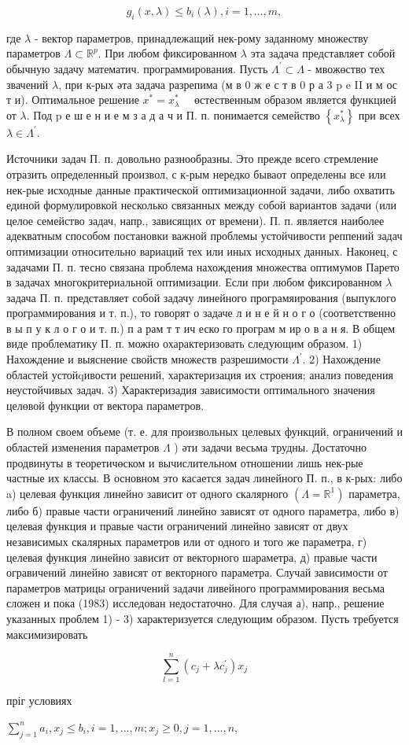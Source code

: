 \documentclass[10pt]{article}
\begin{document}
\[
g_{i}(x, \lambda) \leqslant b_{i}(\lambda), i=1, \ldots, m,
\]

где $\lambda$ - вектор параметров, принадлежащий нек-рому заданному множеству параметров $\Lambda \subset \mathbb{R}^{p}$. При любом фиксированном $\lambda$ эта задача представляет собой обычную задачу математич. программирования. Пусть $\Lambda^{\prime} \subset \Lambda$ - мвожөство тех звачений $\lambda$, при к-рых әта задача разрепима (м в 0 ж е с т в 0 р а 3 p e II и м ос т и). Оптимальное решение $x^{*}=x_{\lambda}^{*} \quad$ өстественным образом является функцией от $\lambda$. Под $\mathrm{p}$ е ш е н и е м з а д а ч и П. п. понимается семейство $\left\{x_{\lambda}^{*}\right\}$ при всех $\lambda \in \Lambda^{\prime}$.

Источники задач П. п. довольно разнообразны. Это прежде всего стремление отразить определенный произвол, с к-рым нередко бываот определены все или нек-рые исходные данные практической оптимизационной задачи, либо охватить единой формулировкой несколько связанных между собой вариантов задачи (или целое семейство задач, напр., зависящих от времени). П. п. является наиболее адекватным способом постановки важной проблемы устойчивости реппений задач оптимизации относительно вариаций тех или иных исходных данных. Наконец, с задачами П. п. тесно связана проблема нахождения множества оптимумов Парето в задачах многокритериальной оптимизации. Если при любом фиксированном $\lambda$ задача П. п. представляет собой задачу линейного програмяирования (выпуклого программирования и т. п.), то говорят о задаче л и н е й н о г о (соответственно в ы п у к л о г о и т. п.) п а рам т т ич еско го програм м ир о в а н я. В общем виде проблематику П. п. можно охарактеризовать следующим образом. 1) Нахождение и выяснение свойств множеств разрешимости $\Lambda^{\prime}$. 2) Нахождение областей устойqивости решений, характеризация их строения; анализ поведения неустойчивых задач. 3) Характеризадия зависимости оптимального значения целөвой функции от вектора параметров.

В полном своем объеме (т. е. для произвольных целевых функций, ограничений и областей изменения параметров $\Lambda$ ) әти задачи весьма трудны. Достаточно продвинуты в теоретичөском и вычислительном отношении лишь нек-рые частные их классы. В основном это касается задач линейного П. п., в к-рых: либо a) целевая функция линейно зависит от одного скалярного $\left(\Lambda=\mathbb{R}^{1}\right)$ параметра, либо б) правые части ограничений линейно зависят от одного параметра, либо в) целевая функция и правые части ограничений линейно зависят от двух независимых скалярных параметров или от одного и того же параметра, г) целевая функция линейно зависит от векторного шараметра, д) правые части огравичений линейно зависят от векторного параметра. Случай зависимости от параметров матрицы ограничений задачи ливейного программирования весьма сложен и пока (1983) исследован недостаточно. Для случая а), напр., решение указанных проблем 1) - 3) характеризуется следующим образом. Пусть требуется максимизировать

\[
\sum_{l=1}^{n}\left(c_{j}+\lambda c_{j}^{\prime}\right) x_{j}
\]

пріг условиях

$\sum_{j=1}^{n} a_{i}, x_{j} \leqslant b_{i}, i=1, \ldots, m ; x_{j} \geqslant 0, j=1, \ldots, n$,
\end{document}
